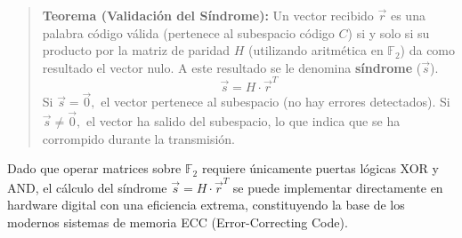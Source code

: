\begin{quote}\textbf{Teorema (Validación del Síndrome):}\label{sindrome_hamming}
Un vector recibido $\vec{r}$ es una palabra código válida (pertenece al subespacio código $C$) si y solo si su producto por la matriz de paridad $H$ (utilizando aritmética en $\mathbb{F}_2$) da como resultado el vector nulo. A este resultado se le denomina \textbf{síndrome} ($\vec{s}$).
\[ \vec{s} = H \cdot \vec{r}^T \]
Si $\vec{s} = \vec{0},$ el vector pertenece al subespacio (no hay errores detectados). Si $\vec{s} \ne \vec{0},$ el vector ha salido del subespacio, lo que indica que se ha corrompido durante la transmisión.
\end{quote}

Dado que operar matrices sobre $\mathbb{F}_2$ requiere únicamente puertas lógicas XOR y AND, el cálculo del síndrome $\vec{s} = H \cdot \vec{r}^T$ se puede implementar directamente en hardware digital con una eficiencia extrema, constituyendo la base de los modernos sistemas de memoria ECC (Error-Correcting Code).
